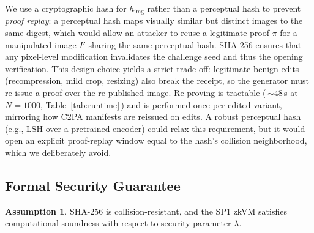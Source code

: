 \documentclass{article}
\theoremstyle{plain}
\theoremstyle{definition}
\newtheorem{assumption}[theorem]{Assumption}
\theoremstyle{remark}
\begin{document}
We use a cryptographic hash for $h_{\mathrm{img}}$ rather than a perceptual hash to prevent \emph{proof replay}: a perceptual hash maps visually similar but distinct images to the same digest, which would allow an attacker to reuse a legitimate proof $\pi$ for a manipulated image $I'$ sharing the same perceptual hash. SHA-256 ensures that any pixel-level modification invalidates the challenge seed and thus the opening verification. This design choice yields a strict trade-off: legitimate benign edits (recompression, mild crop, resizing) also break the receipt, so the generator must re-issue a proof over the re-published image. Re-proving is tractable (\,$\sim\!48\,$s at $N{=}1000$, Table~\ref{tab:runtime}\,) and is performed once per edited variant, mirroring how C2PA manifests are reissued on edits. A robust perceptual hash (e.g., LSH over a pretrained encoder) could relax this requirement, but it would open an explicit proof-replay window equal to the hash's collision neighborhood, which we deliberately avoid.

\subsection{Formal Security Guarantee}

\begin{assumption}\label{asm:crypto}
SHA-256 is collision-resistant, and the SP1 zkVM satisfies computational soundness with respect to security parameter $\lambda$.
\end{assumption}
\end{document}
